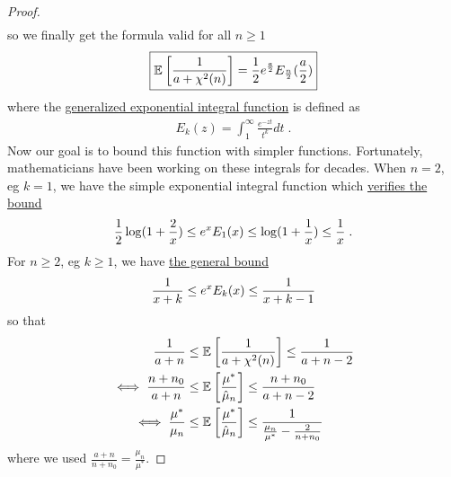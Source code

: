\documentclass{article}
\newcommand*{\expect}[2][]{\ensuremath{\mathbb{E}_{#1} \left[ #2 \right] }} %
\newcommand{\MAPm}{\hat \mu_n}
\begin{document}
\begin{proof}
\begin{align}
	\end{align}
	so we finally get  the formula valid for all $n\geq 1$
	\begin{align}
		\boxed{\expect{\inv{a + \chi^2(n)}}  = \half e^{\frac{a}{2}} E_{\half[n]}(\half[a])}
		\label{eq:hard_expectation}
	\end{align}
	where the \href{https://dlmf.nist.gov/8.19}{generalized exponential integral function} is defined as 
	\begin{align}
		E_k(z) = \int_1^\infty \frac{e^{-z t} }{t^k} dt \; .
	\end{align}
	Now our goal is to bound this function with simpler functions.
	Fortunately, mathematicians have been working on these integrals for decades.
	When $n=2$, eg $k=1$, we have the simple exponential integral function which \href{https://dlmf.nist.gov/6.8.E1}{verifies the bound}
	\begin{align}
		\frac{1}{2} \log(1 + \frac{2}{x}) 
		\leq e^x E_1(x) 
		\leq \log(1+\frac{1}{x}) \leq \frac{1}{x} \; .
	\end{align}
	For $n \geq 2$, eg $k\geq 1$, we have \href{https://dlmf.nist.gov/8.19.E21}{the general bound}
	\begin{align}
		\frac{1}{x+k}
		\leq e^x E_k(x) 
		\leq \frac{1}{x + k - 1}
	\end{align}
	so that 
	\begin{align}
		\inv{a+n}
		&\leq \expect{\inv{a + \chi^2(n)}}
		\leq \inv{a + n - 2} \\
		\iff \frac{n +n_0}{a + n}	
		&\leq  \expect{\frac{\mu^*}{\MAPm}} 
		\leq \frac{n +n_0}{a + n - 2}	\\
		\iff \frac{\mu^*}{\mu_n}
		&\leq \expect{\frac{\mu^*}{\MAPm}} 
		\leq \frac{1}{\frac{\mu_n}{\mu^*} - \frac{2}{n + n_0}}  
	\end{align}
	where we used $\frac{a + n}{n +n_0} = \frac{\mu_n}{\mu^*}$.
	

\end{proof}
\end{document}
